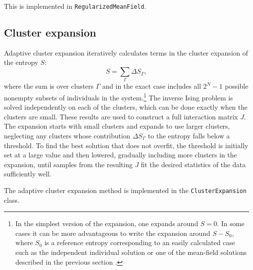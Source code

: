 \documentclass[aps,prl,twocolumn,nofootinbib]{revtex4-1}
\begin{document}
This is implemented in {\tt RegularizedMeanField}.



\subsection{Cluster expansion}

Adaptive cluster expansion \cite{Monasson:2011fo,CocMon12,BarCoc13}
iteratively calculates terms in the
cluster expansion of the entropy $S$:
\begin{equation}
S = \sum_\Gamma \Delta S_\Gamma,
\end{equation}
where the sum is over clusters $\Gamma$ and in the exact case
includes all $2^N - 1$ possible nonempty subsets of individuals in the system.\footnote{In the simplest version of the expansion,
one expands around $S=0$.  In some cases it can be more advantageous to write the
expansion around $S-S_0$, where $S_0$ is a reference entropy corresponding to
an easily calculated case such as
the independent individual solution or one of the mean-field solutions
described in the previous section \cite{BarCoc13}.}
The inverse Ising problem is solved independently
on each of the clusters, which can be done exactly when the
clusters are small.  These results are used to construct a full
interaction matrix $J$.
The expansion starts with small clusters and expands to use larger
clusters, neglecting any clusters whose
contribution $\Delta S_\Gamma$ to the entropy falls below a threshold.
To find the best solution that does not overfit,
the threshold is initially set at a large value and then lowered,
gradually including more clusters in the expansion, until samples from
the resulting $J$ fit the desired statistics of the data sufficiently well.

The adaptive cluster expansion method is implemented in the {\tt ClusterExpansion} class.


\end{document}
